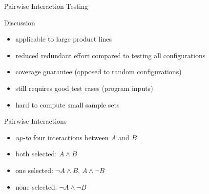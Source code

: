 \begin{frame}{\myframetitle}
\begin{mycolumns}
\begin{definition}{Pairwise Interaction Testing}
		\end{definition}
	\mynextcolumn
		\pause
		\begin{note}{Discussion}
			\begin{itemize}
				\setlength\itemsep{.4em}
				\item applicable to large product lines
				\item reduced redundant effort compared to testing all configurations
				\item coverage guarantee (opposed to random configurations)
				\item still requires good test cases (program inputs)
				\item hard to compute small sample sets
			\end{itemize}
		\end{note}
		\pause
		\begin{definition}{Pairwise Interactions}
			\begin{itemize}
				\setlength\itemsep{.5em}
				\item \emph{up-to} four interactions between $A$ and $B$
				\item both selected: $A \wedge B$
				\item one selected: $\neg A \wedge B$, $A \wedge \neg B$
				\item none selected: $\neg A \wedge \neg B$
			\end{itemize}
		\end{definition}
	\end{mycolumns}
\end{frame}

\newcommand{\pair}[2]{$#1 \wedge #2$ & $#1 \wedge \neg #2$ & $\neg #1 \wedge #2$ & $\neg #1 \wedge \neg #2$\\}
\newcommand{\redandgray}[1]{\only<#1-| handout:#1->{\color{black}}\only<#1| handout:#1>{\color{blue}}}
\newcommand{\epair}[6]{
	{\redandgray{#3}$#1 \wedge #2$} & 
	{\redandgray{#4}$#1 \wedge \neg #2$} & 
	{\redandgray{#5}$\neg #1 \wedge #2$} & 
	{\redandgray{#6}$\neg #1 \wedge \neg #2$}\\
}


